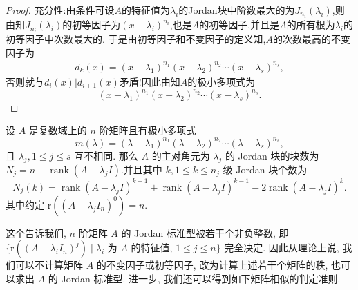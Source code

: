 \documentclass[../../main.tex]{subfiles}%
\begin{document}
\begin{proof}
{\heiti 充分性:}由条件可设$A$的特征值为$\lambda_i$的Jordan块中阶数最大的为$J_{n_i}(\lambda_i)$,则由知$J_{n_i}(\lambda_i)$的初等因子为$(x-\lambda_i)^{n_i}$,也是$A$的初等因子,并且是$A$的所有根为$\lambda_i$的初等因子中次数最大的.
于是由初等因子和不变因子的定义知,$A$的次数最高的不变因子为
\begin{align*}
d_k(x)=(x-\lambda_1)^{n_1}(x-\lambda_2)^{n_2}\cdots(x-\lambda_s)^{n_s},
\end{align*}
否则就与$d_i(x)|d_{i+1}(x)$矛盾!因此由知$A$的极小多项式为
$$(x-\lambda_1)^{n_1}(x-\lambda_2)^{n_2}\cdots(x-\lambda_s)^{n_s}.$$
\end{proof}


\begin{theorem}[Jordan标准型的计算]\label{theorem:Jordan块的个数与秩的关系}
设 \( A \) 是复数域上的 \( n \) 阶矩阵且有极小多项式  
\[ m(\lambda) = (\lambda - \lambda_1)^{n_1} (\lambda - \lambda_2)^{n_2} \cdots (\lambda - \lambda_s)^{n_s}, \]  
且 \( \lambda_j, 1 \leqslant j \leqslant s \) 互不相同. 那么 \( A \) 的主对角元为 \( \lambda_j \) 的 Jordan 块的块数为 \( N_j = n - \operatorname{rank}(A - \lambda_j I) \).并且其中 \( k, 1 \leqslant k \leqslant n_j \) 级 Jordan 块个数为  
\[ N_j(k) = \operatorname{rank}(A - \lambda_j I)^{k+1} + \operatorname{rank}(A - \lambda_j I)^{k-1} - 2\operatorname{rank}(A - \lambda_j I)^k. \]
其中约定 $\mathrm{r}((A - \lambda_j I_n)^0) = n$.
\end{theorem}
\begin{remark}
这个告诉我们, $n$ 阶矩阵 $A$ 的 Jordan 标准型被若干个非负整数, 即 $\{\mathrm{r}((A - \lambda_i I_n)^j) \mid \lambda_i$ 为 $A$ 的特征值, $1 \leqslant  j \leqslant  n\}$ 完全决定. 因此从理论上说, 我们可以不计算矩阵 $A$ 的不变因子或初等因子, 改为计算上述若干个矩阵的秩, 也可以求出 $A$ 的 Jordan 标准型. 进一步, 我们还可以得到如下矩阵相似的判定准则.
\end{remark}
\end{document}
